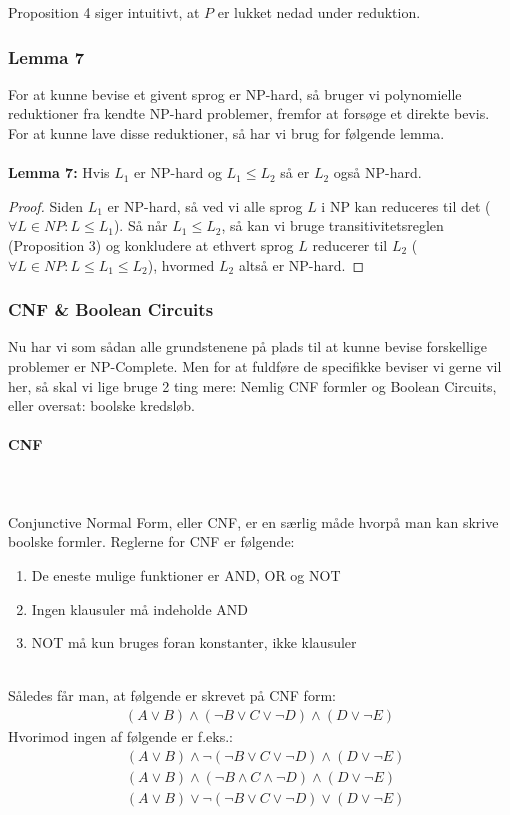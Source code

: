 Proposition 4 siger intuitivt, at $P$ er lukket nedad under reduktion. 

\subsubsection{Lemma 7}

For at kunne bevise et givent sprog er NP-hard, så bruger vi polynomielle reduktioner fra kendte NP-hard problemer, fremfor at forsøge et direkte bevis. For at kunne lave disse reduktioner, så har vi brug for følgende lemma.\\
~\\
\textbf{Lemma 7:} Hvis $L_1$ er NP-hard og $L_1 \leq L_2$ så er $L_2$ også NP-hard.

\begin{proof}
 Siden $L_1$ er NP-hard, så ved vi alle sprog $L$ i NP kan reduceres til det ($\forall L \in NP: L \leq L_1$). Så når $L_1 \leq L_2$, så kan vi bruge transitivitetsreglen (Proposition 3) og konkludere at ethvert sprog $L$ reducerer til $L_2$ ($\forall L \in NP: L \leq L_1 \leq L_2$), hvormed $L_2$ altså er NP-hard.
\end{proof}

\subsubsection{CNF \& Boolean Circuits}

Nu har vi som sådan alle grundstenene på plads til at kunne bevise forskellige problemer er NP-Complete. Men for at fuldføre de specifikke beviser vi gerne vil her, så skal vi lige bruge 2 ting mere: Nemlig CNF formler og Boolean Circuits, eller oversat: boolske kredsløb.\\

\paragraph{CNF}
~\\
~\\
Conjunctive Normal Form, eller CNF, er en særlig måde hvorpå man kan skrive boolske formler. Reglerne for CNF er følgende:
\begin{enumerate}
 \item De eneste mulige funktioner er AND, OR og NOT
 \item Ingen klausuler må indeholde AND
 \item NOT må kun bruges foran konstanter, ikke klausuler
\end{enumerate}
~\\
Således får man, at følgende er skrevet på CNF form:
\begin{align*}
 (A \vee B) \wedge (\neg B \vee C \vee \neg D) \wedge (D \vee \neg E)
\end{align*}
Hvorimod ingen af følgende er f.eks.:
\begin{align*}
 &(A \vee B) \wedge \neg(\neg B \vee C \vee \neg D) \wedge (D \vee \neg E) \\
 &(A \vee B) \wedge (\neg B \wedge C \wedge \neg D) \wedge (D \vee \neg E) \\
 &(A \vee B) \vee \neg(\neg B \vee C \vee \neg D) \vee (D \vee \neg E)
\end{align*}

